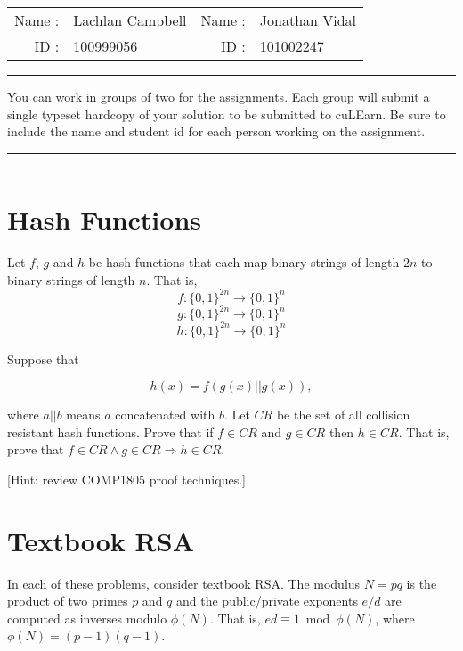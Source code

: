 \documentclass[12pt, letterpaper]{article}
\begin{document}
{\Large
\begin{tabular}{rm{6cm}rm{6cm}}
Name :  & Lachlan Campbell & Name : & Jonathan Vidal           \\
ID :    & 100999056   & ID :   & 101002247
\end{tabular}
}

\bigskip
\hrule
\bigskip


You can work in groups of two for the assignments. Each group will submit a single
typeset hardcopy of your solution to be submitted to cuLEarn. Be sure to include the name and student id for
each person working on the assignment.  

\bigskip   %
\hrule     %
\bigskip   %
\hrule     %



\section{Hash Functions}

Let $f$, $g$ and $h$ be hash functions that each map binary strings of length $2n$ to binary strings of length $n$. That is,
\[ f\colon \{0,1\}^{2n} \to \{0,1\}^n \]
\[ g\colon \{0,1\}^{2n} \to \{0,1\}^n \]
\[ h\colon \{0,1\}^{2n} \to \{0,1\}^n \]

Suppose that  

 \[h(x) = f( g(x) || g(x) ),\]

where $a||b$ means $a$ concatenated with $b$.  
Let $CR$ be the set of all collision resistant hash functions. Prove that if $f \in CR$ and $g \in CR$ then $h \in CR$. That is, prove that $f \in CR \land g \in CR \Rightarrow h \in CR$.

\medskip

[Hint: review COMP1805 proof techniques.]



\section{Textbook RSA}

In each of these problems, consider textbook RSA.  
The modulus $N = pq$ is the product of two primes $p$ and $q$ and the public/private exponents $e/d$ are computed
as inverses modulo $\phi(N)$.  That is, $ed \equiv 1 \bmod {\phi(N)}$, where $\phi(N) = (p-1)(q-1)$.
\end{document}
